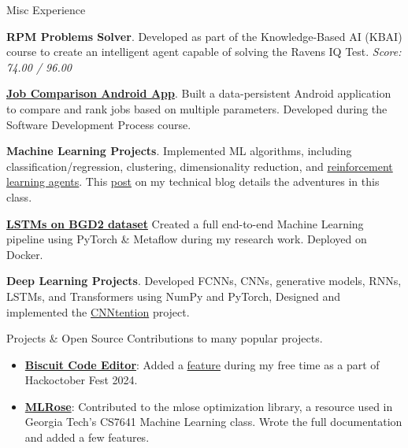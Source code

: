 \begin{rubric}{Misc Experience}


\entry*[Summer 2023] \textbf{RPM Problems Solver}. Developed as part of the Knowledge-Based AI (KBAI) course to create an intelligent agent capable of solving the Ravens IQ Test.  
\textit{Score: 74.00 / 96.00}  

\entry*[Fall 2023] \textbf{\href{https://www.youtube.com/watch?v=BDsmPKvq3rs}{Job Comparison Android App}}. Built a data-persistent Android application to compare and rank jobs based on multiple parameters. Developed during the Software Development Process course.  

\entry*[Spring 2024] \textbf{Machine Learning Projects}. Implemented ML algorithms, including classification/regression, clustering, dimensionality reduction, and \href{https://www.youtube.com/watch?v=6nc1xtTQcNY}{reinforcement learning agents}. This \href{https://nkapila.me/masters/cs7641-review}{post} on my technical blog details the adventures in this class.

\entry*[Summer 2024] \textbf{\href{https://github.com/nkapila6/lstm-bgd2}{LSTMs on BGD2 dataset}} Created a full end-to-end Machine Learning pipeline using PyTorch \& Metaflow during my research work. Deployed on Docker.

\entry*[Fall 2024] \textbf{Deep Learning Projects}. Developed FCNNs, CNNs, generative models, RNNs, LSTMs, and Transformers using NumPy and PyTorch, Designed and implemented the \href{https://github.com/AttentionSeekers/CNNtention}{CNNtention} project.

\entry*[Misc] Projects \& Open Source Contributions to many popular projects.
\begin{itemize}
    \item \textbf{\href{https://github.com/tomlin7/biscuit/}{Biscuit Code Editor}}: Added a \href{https://github.com/tomlin7/biscuit/pull/420}{feature} during my free time as a part of Hackoctober Fest 2024.
    \item \textbf{\href{https://nkapila6.github.io/mlrose-ky/}{MLRose}}: Contributed to the mlose optimization library, a resource used in Georgia Tech's CS7641 Machine Learning class. Wrote the full documentation and added a few features. 
\end{itemize}


\end{rubric}
